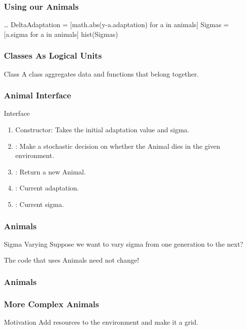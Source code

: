\begin{frame}[fragile] 
\frametitle{Using our Animals}

\begin{python}
\ldots
DeltaAdaptation = [math.abs(y-a.adaptation) 
                    for a in animals]
Sigmas = [a.sigma for a in animals]
hist(Sigmas)
\end{python}

\end{frame}

\begin{frame}[fragile] 
\frametitle{Classes As Logical Units}
\begin{block}{Class}
A class aggregates data and functions that belong together.
\end{block}
\end{frame}

\begin{frame}[fragile] 
\frametitle{Animal Interface}

\begin{block}{Interface}
\begin{enumerate}
\item Constructor: Takes the initial adaptation value and sigma.
\item {}: Make a stochastic decision on whether the Animal dies in the given environment.
\item {}: Return a new Animal.
\item {}: Current adaptation.
\item {}: Current sigma.
\end{enumerate}
\end{block}
\end{frame}

\begin{frame}[fragile] 
\frametitle{Animals}
\begin{block}{Sigma Varying}
Suppose we want to vary sigma from one generation to the next?
\end{block}

The \alert{code that uses Animals} need not change!
\end{frame}
\begin{frame}[fragile] 
\frametitle{Animals}

\end{frame}

\begin{frame}[fragile] 
\frametitle{More Complex Animals}
\begin{block}{Motivation}
Add resources to the environment and make it a grid.
\end{block}
\end{frame}

